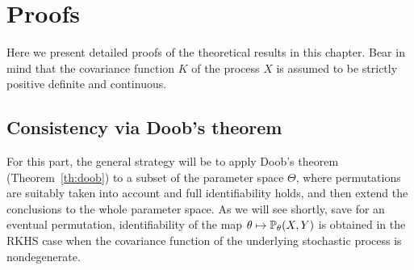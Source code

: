 \section{Proofs}\label{sec:proofs-bfr}

Here we present detailed proofs of the theoretical results in this chapter. Bear in mind that the covariance function \(K\) of the process \(X\) is assumed to be strictly positive definite and continuous.

\subsection{Consistency via Doob's theorem}

For this part, the general strategy will be to apply Doob's theorem (Theorem~\ref{th:doob}) to a subset of the parameter space \(\Theta\), where permutations are suitably taken into account and full identifiability holds, and then extend the conclusions to the whole parameter space. As we will see shortly, save for an eventual permutation, identifiability of the map \(\theta \mapsto \mathbb{P}_\theta(X,Y)\) is obtained in the \acs{RKHS} case when the covariance function of the underlying stochastic process is nondegenerate.

